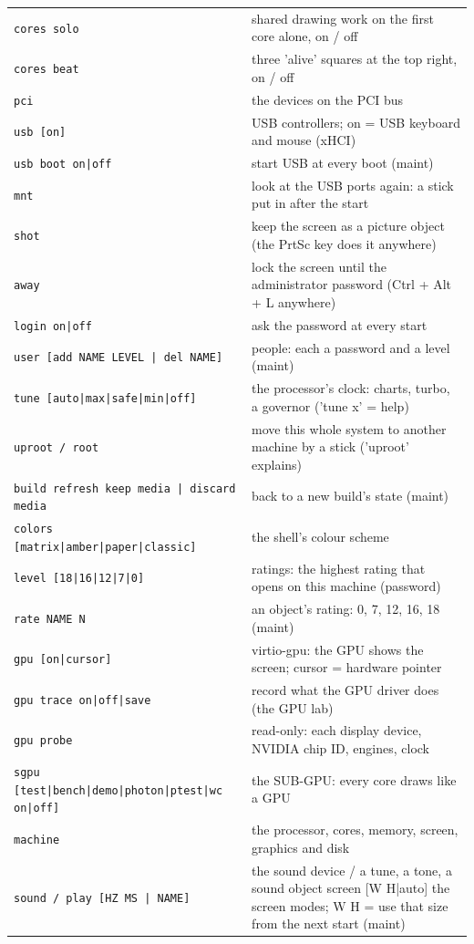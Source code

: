 \begin{longtable}{@{}p{5.2cm} p{9.8cm}@{}}
\texttt{cores solo} & shared drawing work on the first core alone, on / off \\
\texttt{cores beat} & three 'alive' squares at the top right, on / off \\
\texttt{pci} & the devices on the PCI bus \\
\texttt{usb [on]} & USB controllers; on = USB keyboard and mouse (xHCI) \\
\texttt{usb boot on|off} & start USB at every boot (maint) \\
\texttt{mnt} & look at the USB ports again: a stick put in after the start \\
\texttt{shot} & keep the screen as a picture object (the PrtSc key does it anywhere) \\
\texttt{away} & lock the screen until the administrator password (Ctrl + Alt + L anywhere) \\
\texttt{login on|off} & ask the password at every start \\
\texttt{user [add NAME LEVEL | del NAME]} & people: each a password and a level (maint) \\
\texttt{tune [auto|max|safe|min|off]} & the processor's clock: charts, turbo, a governor ('tune x' = help) \\
\texttt{uproot / root} & move this whole system to another machine by a stick ('uproot' explains) \\
\texttt{build refresh keep media | discard media} & back to a new build's state (maint) \\
\texttt{colors [matrix|amber|paper|classic]} & the shell's colour scheme \\
\texttt{level [18|16|12|7|0]} & ratings: the highest rating that opens on this machine (password) \\
\texttt{rate NAME N} & an object's rating: 0, 7, 12, 16, 18 (maint) \\
\texttt{gpu [on|cursor]} & virtio-gpu: the GPU shows the screen; cursor = hardware pointer \\
\texttt{gpu trace on|off|save} & record what the GPU driver does (the GPU lab) \\
\texttt{gpu probe} & read-only: each display device, NVIDIA chip ID, engines, clock \\
\texttt{sgpu [test|bench|demo|photon|ptest|wc on|off]} & the SUB-GPU: every core draws like a GPU \\
\texttt{machine} & the processor, cores, memory, screen, graphics and disk \\
\texttt{sound / play [HZ MS | NAME]} & the sound device / a tune, a tone, a sound object screen [W H|auto] the screen modes; W H = use that size from the next start (maint) \\

\end{longtable}
